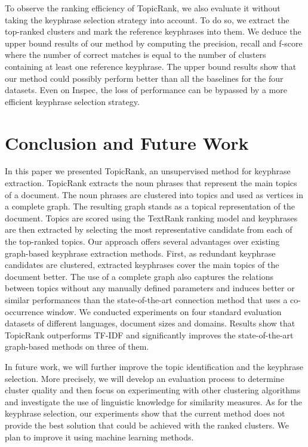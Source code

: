   To observe the ranking efficiency of TopicRank, we also evaluate it without
  taking the keyphrase selection strategy into account. To do so, we extract the
  top-ranked clusters and mark the reference keyphrases into them. We deduce the
  upper bound results of our method by computing the precision, recall and
  f-score where the number of correct matches is equal to the number of
  clusters containing at least one reference keyphrase. The upper bound results
  show that our method could possibly perform better than all the baselines for
  the four datasets. Even on Inspec, the loss of performance can be bypassed by
  a more efficient keyphrase selection strategy.

\section{Conclusion and Future Work}
\label{sec:conclusion_and_future_work}
  In this paper we presented TopicRank, an unsupervised method for keyphrase
  extraction. TopicRank extracts the noun phrases that represent the main topics
  of a document. The noun phrases are clustered into topics and used as vertices
  in a complete graph. The resulting graph stands as a topical representation of
  the document. Topics are scored using the TextRank ranking model and
  keyphrases are then extracted by selecting the most representative candidate
  from each of the top-ranked topics. Our approach offers several advantages
  over existing graph-based keyphrase extraction methods. First, as redundant
  keyphrase candidates are clustered, extracted keyphrases cover the main topics
  of the document better. The use of a complete graph also captures the
  relations between topics without any manually defined parameters and induces
  better or similar performances than the state-of-the-art connection method
  that uses a co-occurrence window. We conducted experiments on four standard
  evaluation datasets of different languages, document sizes and domains.
  Results show that TopicRank outperforms TF-IDF and significantly improves the
  state-of-the-art graph-based methods on three of them.

  In future work, we will further improve the topic identification and the
  keyphrase selection. More precisely, we will develop an evaluation process to
  determine cluster quality and then focus on experimenting with other
  clustering algorithms and investigate the use of linguistic knowledge for
  similarity measures. As for the keyphrase selection, our experiments show that
  the current method does not provide the best solution that could be achieved
  with the ranked clusters. We plan to improve it using machine learning
  methods.

